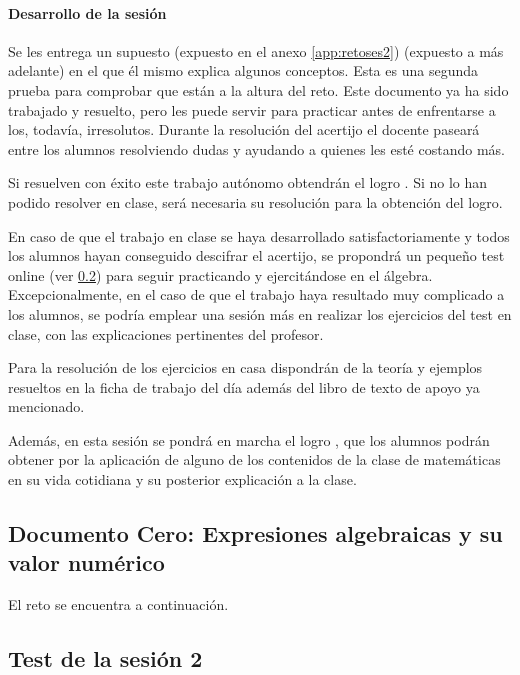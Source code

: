 \paragraph{Desarrollo de la sesión} 

Se les entrega un supuesto  
%
\ifinapp
	(expuesto en el anexo \ref{app:retoses2})
\else 
	(expuesto a más adelante)
\fi 
%
en el que él mismo explica algunos conceptos.
%
Esta es una segunda prueba para comprobar que están a la altura del reto.
%
Este documento ya ha sido trabajado y resuelto, pero les puede servir para practicar antes de enfrentarse a los, todavía, irresolutos.
%
Durante la resolución del acertijo el docente paseará entre los alumnos resolviendo dudas y ayudando a quienes les esté costando más. 

Si resuelven con éxito este trabajo autónomo obtendrán el logro .
%
Si no lo han podido resolver en clase, será necesaria su resolución para la obtención del logro.

En caso de que el trabajo en clase se haya desarrollado satisfactoriamente y todos los alumnos hayan conseguido descifrar el acertijo, se propondrá un pequeño test online (ver \ref{test:ses2}) para seguir practicando y ejercitándose en el álgebra.
%
Excepcionalmente, en el caso de que el trabajo haya resultado muy complicado a los alumnos, se podría emplear una sesión más en realizar los ejercicios del test en clase, con las explicaciones pertinentes del profesor.

Para la resolución de los ejercicios en casa dispondrán de la teoría y ejemplos resueltos en la ficha de trabajo del día además del libro de texto de apoyo ya mencionado.

Además, en esta sesión se pondrá en marcha el logro , que los alumnos podrán obtener por la aplicación de alguno de los contenidos de la clase de matemáticas en su vida cotidiana y su posterior explicación a la clase.

\ifinapp
\else
	\subsection{Documento Cero: Expresiones algebraicas y su valor numérico}
	\label{app:DocModel}
	El reto se encuentra a continuación.
	
\fi


\subsection{Test de la sesión 2}
\label{test:ses2}

